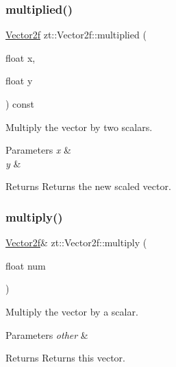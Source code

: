 \subsubsection{\texorpdfstring{multiplied()}{multiplied()}\hspace{0.1cm}{\footnotesize\ttfamily [2/2]}}
{\footnotesize\ttfamily \hyperlink{classzt_1_1_vector2f}{Vector2f} zt\+::\+Vector2f\+::multiplied (\begin{DoxyParamCaption}\item[{float}]{x,  }\item[{float}]{y }\end{DoxyParamCaption}) const}



Multiply the vector by two scalars. 


\begin{DoxyParams}{Parameters}
{\em x} & \\
\hline
{\em y} & \\
\hline
\end{DoxyParams}
\begin{DoxyReturn}{Returns}
Returns the new scaled vector. 
\end{DoxyReturn}
\mbox{\label{classzt_1_1_vector2f_aada2302369ae96e18db8362768702bd0}} 
\subsubsection{\texorpdfstring{multiply()}{multiply()}\hspace{0.1cm}{\footnotesize\ttfamily [1/2]}}
{\footnotesize\ttfamily \hyperlink{classzt_1_1_vector2f}{Vector2f}\& zt\+::\+Vector2f\+::multiply (\begin{DoxyParamCaption}\item[{float}]{num }\end{DoxyParamCaption})}



Multiply the vector by a scalar. 


\begin{DoxyParams}{Parameters}
{\em other} & \\
\hline
\end{DoxyParams}
\begin{DoxyReturn}{Returns}
Returns this vector. 
\end{DoxyReturn}
\mbox{\label{classzt_1_1_vector2f_a72873ae6ba73ade6dcabe23f482b4f82}} 
